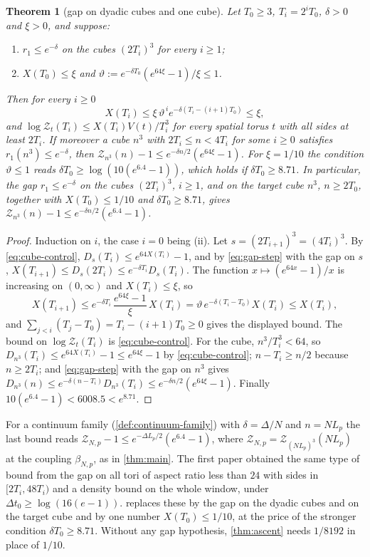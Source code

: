 \documentclass[11pt,a4paper]{amsart}
\newtheorem{theorem}{Theorem}[section]
\theoremstyle{definition}
\theoremstyle{remark}
\numberwithin{equation}{section}
\newcommand{\TT}{\mathbb{T}}               %
\newcommand{\Zc}{\mathcal{Z}}              %
\newcommand{\Zs}[2]{\Zc_{#1}(#2)}          %
\newcommand{\Dexc}[2]{D_{#1}(#2)}          %
\newcommand{\Vol}[1]{V(#1)}                %
\newcommand{\cube}[1]{(2#1)^3}             %
\newcommand{\xconst}{\frac{1}{8192}}       %
\newcommand{\xconstinl}{1/8192}            %
\newcommand{\tzero}{t_0}                   %
\newcommand{\Lp}{L_p}                      %
\newcommand{\betaNp}{\beta_{N,p}}          %
\begin{document}
\begin{theorem}[gap on dyadic cubes and one cube]\label{thm:dyadic-gap}
Let $T_0\ge3$, $T_i=2^iT_0$, $\delta>0$ and $\xi>0$, and suppose:
\begin{enumerate}[label=(\roman*)]
\item $r_1\le e^{-\delta}$ on the cubes $\cube{T_i}$ for every $i\ge1$;
\item $X(T_0)\le\xi$ and $\vartheta:=e^{-\delta T_0}(e^{64\xi}-1)/\xi\le1$.
\end{enumerate}
Then for every $i\ge0$
\[
X(T_i)\le\xi\,\vartheta^{\,i}e^{-\delta(T_i-(i+1)T_0)}\le\xi,
\]
and $\log\Zs{t}{T_i}\le X(T_i)\Vol{t}/T_i^3$ for every spatial torus $t$ with all sides at least $2T_i$.
If moreover a cube $n^3$ with $2T_i\le n<4T_i$ for some $i\ge0$ satisfies $r_1(n^3)\le e^{-\delta}$, then $\Zs{n^3}{n}-1\le e^{-\delta n/2}(e^{64\xi}-1)$. For $\xi=1/10$ the condition $\vartheta\le1$ reads $\delta T_0\ge\log(10(e^{6.4}-1))$, which holds if $\delta T_0\ge8.71$. In particular, the gap $r_1\le e^{-\delta}$ on the cubes $\cube{T_i}$, $i\ge1$, and on the target cube $n^3$, $n\ge2T_0$, together with $X(T_0)\le1/10$ and $\delta T_0\ge8.71$, gives $\Zs{n^3}{n}-1\le e^{-\delta n/2}(e^{6.4}-1)$.
\end{theorem}

\begin{proof}
Induction on $i$, the case $i=0$ being (ii). Let $s=\cube{T_{i+1}}=(4T_i)^3$. By \eqref{eq:cube-control}, $\Dexc{s}{T_i}\le e^{64X(T_i)}-1$, and by \eqref{eq:gap-step} with the gap on $s$, $X(T_{i+1})\le\Dexc{s}{2T_i}\le e^{-\delta T_i}\Dexc{s}{T_i}$. The function $x\mapsto(e^{64x}-1)/x$ is increasing on $(0,\infty)$ and $X(T_i)\le\xi$, so
\[
X(T_{i+1})\le e^{-\delta T_i}\,\frac{e^{64\xi}-1}{\xi}\,X(T_i)=\vartheta\,e^{-\delta(T_i-T_0)}X(T_i)\le X(T_i),
\]
and $\sum_{j<i}(T_j-T_0)=T_i-(i+1)T_0\ge0$ gives the displayed bound. The bound on $\log\Zs{t}{T_i}$ is \eqref{eq:cube-control}. For the cube, $n^3/T_i^3<64$, so $\Dexc{n^3}{T_i}\le e^{64X(T_i)}-1\le e^{64\xi}-1$ by \eqref{eq:cube-control}; $n-T_i\ge n/2$ because $n\ge2T_i$; and \eqref{eq:gap-step} with the gap on $n^3$ gives $\Dexc{n^3}{n}\le e^{-\delta(n-T_i)}\Dexc{n^3}{T_i}\le e^{-\delta n/2}(e^{64\xi}-1)$. Finally $10(e^{6.4}-1)<6008.5<e^{8.71}$.
\end{proof}

For a continuum family (\cref{def:continuum-family}) with $\delta=\Delta/N$ and $n=N\Lp$ the last bound reads $\Zc_{N,p}-1\le e^{-\Delta\Lp/2}(e^{6.4}-1)$, where $\Zc_{N,p}=\Zs{(N\Lp)^3}{N\Lp}$ at the coupling $\betaNp$, as in \cref{thm:main}. The first paper \cite[Theorem~6]{bhattacharjee2026first} obtained the same type of bound from the gap on all tori of aspect ratio less than $24$ with sides in $[2T_i,48T_i)$ and a density bound on the whole window, under $\Delta\tzero\ge\log(16(e-1))$.  replaces these by the gap on the dyadic cubes and on the target cube and by one number $X(T_0)\le1/10$, at the price of the stronger condition $\delta T_0\ge8.71$. Without any gap hypothesis, \cref{thm:ascent} needs $\xconstinl$ in place of $1/10$.
\end{document}
